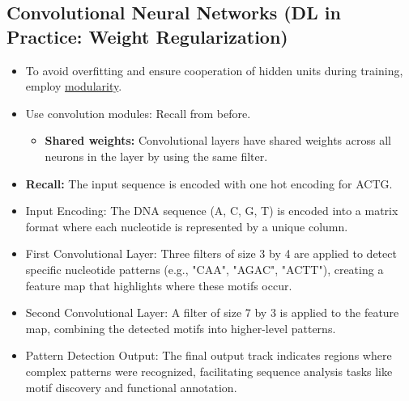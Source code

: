 \subsection{Convolutional Neural Networks (DL in Practice: Weight Regularization)}
\begin{summary}
    \begin{itemize}
        \item To avoid overfitting and ensure cooperation of hidden units during training, employ \underline{modularity}.
        \item Use convolution modules: Recall from before.
        \begin{itemize}
            \item \textbf{Shared weights:} Convolutional layers have shared weights across all neurons in the layer by using the same filter.
        \end{itemize}
    \end{itemize}
    \begin{itemize}
        \item \textbf{Recall:} The input sequence is encoded with one hot encoding for ACTG. 
        \item Input Encoding: The DNA sequence (A, C, G, T) is encoded into a matrix format where each nucleotide is represented by a unique column.
        \item First Convolutional Layer: Three filters of size 3 by 4 are applied to detect specific nucleotide patterns (e.g., "CAA", "AGAC", "ACTT"), creating a feature map that highlights where these motifs occur.
        \item Second Convolutional Layer: A filter of size 7 by 3 is applied to the feature map, combining the detected motifs into higher-level patterns.
        \item Pattern Detection Output: The final output track indicates regions where complex patterns were recognized, facilitating sequence analysis tasks like motif discovery and functional annotation.
    \end{itemize}
\end{summary}

